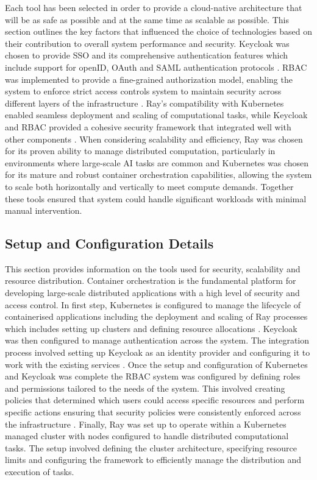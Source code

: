 Each tool has been selected in order to provide a cloud-native architecture that will be as safe as possible and at the same time as scalable as possible. This section outlines the key factors that influenced the choice of technologies based on their contribution to overall system performance and security. Keycloak was chosen to provide SSO and its comprehensive authentication features which include support for openID, OAuth and SAML authentication protocols \cite{keycloak_doc}.  RBAC was implemented to provide a fine-grained authorization model, enabling the system to enforce strict access controls system to maintain security across different layers of the infrastructure \cite{Kubernetes_doc}. Ray's compatibility with Kubernetes enabled seamless deployment and scaling of computational tasks, while Keycloak and RBAC provided a cohesive security framework that integrated well with other components \cite{ray_doc, keycloak_doc}. When considering scalability and efficiency, Ray was chosen for its proven ability to manage distributed computation, particularly in environments where large-scale AI tasks are common and Kubernetes was chosen for its mature and robust container orchestration capabilities, allowing the system to scale both horizontally and vertically to meet compute demands. Together these tools ensured that system could handle significant workloads with minimal manual intervention. \cite{ray_doc}


\subsection{Setup and Configuration Details}

This section provides information on the tools used for security, scalability and resource distribution. Container orchestration is the fundamental platform for developing large-scale distributed applications with a high level of security and access control. 
In first step, Kubernetes is configured to manage the lifecycle of containerised applications including the deployment and scaling of Ray processes which includes setting up clusters and defining resource allocations \cite{Kubernetes_doc}. Keycloak was then configured to manage authentication across the system. The integration process involved setting up Keycloak as an identity provider and configuring it to work with the existing services \cite{keycloak_doc}. Once the setup and configuration of Kubernetes and Keycloak was complete the RBAC system was configured by defining roles and permissions tailored to the needs of the system. This involved creating policies that determined which users could access specific resources and perform specific actions ensuring that security policies were consistently enforced across the infrastructure \cite{Kubernetes_doc}. Finally, Ray was set up to operate within a Kubernetes managed cluster with nodes configured to handle distributed computational tasks. The setup involved defining the cluster architecture, specifying resource limits and configuring the framework to efficiently manage the distribution and execution of tasks. \cite{ray_doc}

